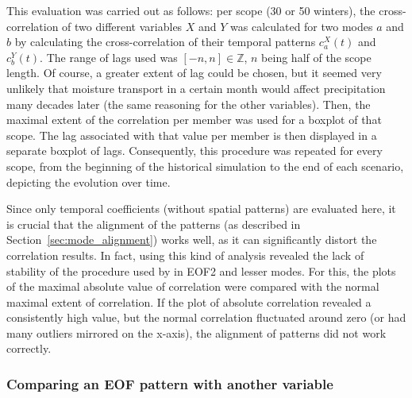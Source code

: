 This evaluation was carried out as follows: per scope (30 or 50 winters), the cross-correlation of two different variables $X$ and $Y$ was calculated for two modes $a$ and $b$ by calculating the cross-correlation of their temporal patterns $c_a^X(t)$ and $c_b^Y(t)$. 
The range of lags used was $[-n,n] \in \mathbb{Z}$, $n$ being half of the scope length. 
Of course, a greater extent of lag could be chosen, but it seemed very unlikely that moisture transport in a certain month would affect precipitation many decades later (the same reasoning for the other variables).
Then, the maximal extent of the correlation per member was used for a boxplot of that scope.
The lag associated with that value per member is then displayed in a separate boxplot of lags. 
Consequently, this procedure was repeated for every scope, from the beginning of the historical simulation to the end of each scenario, depicting the evolution over time.

Since only temporal coefficients (without spatial patterns) are evaluated here, it is crucial that the alignment of the patterns (as described in Section~\ref{sec:mode_alignment}) works well, as it can significantly distort the correlation results. 
In fact, using this kind of analysis revealed the lack of stability of the procedure used by  in EOF2 and lesser modes. 
For this, the plots of the maximal absolute value of correlation were compared with the normal maximal extent of correlation. 
If the plot of absolute correlation revealed a consistently high value, but the normal correlation fluctuated around zero (or had many outliers mirrored on the x-axis), the alignment of patterns did not work correctly.


\subsubsection{Comparing an EOF pattern with another variable}

